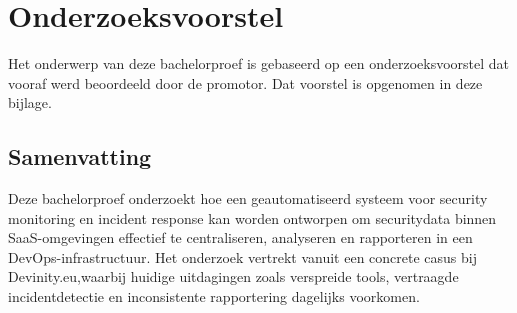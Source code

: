 \documentclass[dutch,dit,thesis]{hogentreport}
\begin{document}













\appendix

\chapter{Onderzoeksvoorstel}

Het onderwerp van deze bachelorproef is gebaseerd op een onderzoeksvoorstel dat vooraf werd beoordeeld door de promotor. Dat voorstel is opgenomen in deze bijlage.


\section*{Samenvatting}

Deze bachelorproef onderzoekt hoe een geautomatiseerd systeem voor security monitoring en incident response kan worden ontworpen om securitydata binnen SaaS-omgevingen effectief te centraliseren, analyseren en rapporteren in een DevOps-infrastructuur. Het onderzoek vertrekt vanuit een concrete casus bij Devinity.eu,waarbij huidige uitdagingen zoals verspreide tools, vertraagde incidentdetectie en inconsistente rapportering dagelijks voorkomen. 
\end{document}
